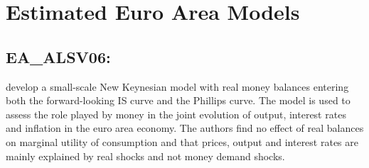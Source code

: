 \documentclass[11pt,a4paper]{article}
\begin{document}
	\section{Estimated Euro Area Models}
	
	\subsection{EA\_ALSV06: \texorpdfstring{ \cite{andres2006lopezsalido}}{AndrÃƒÂ©s et al. (2006)}}
	\label{EAALSV06}
	\cite{andres2006lopezsalido} develop a small-scale New Keynesian model with real money balances entering both the forward-looking IS curve and the Phillips curve. The model is used to assess the role played by money in the joint evolution of output, interest rates and inflation in the euro area economy. The authors find no effect of real balances on marginal utility of consumption and that prices, output and interest rates are mainly explained by real shocks and not money demand shocks.
	
\end{document}
